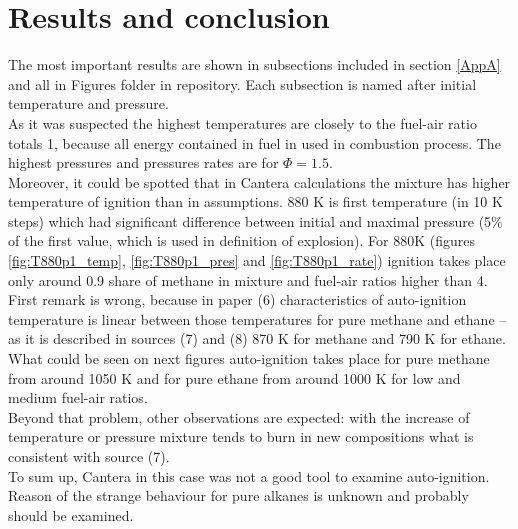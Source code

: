 		
		\section{Results and conclusion}
		The most important results are shown in subsections included in section \ref{AppA} and all in Figures folder in repository. Each subsection is named after initial temperature and pressure.
		\\As it was suspected the highest temperatures are closely to the fuel-air ratio totals 1, because all energy contained in fuel in used in combustion process. The highest pressures and pressures rates are for $\Phi=1.5$. 
		\\Moreover, it could be spotted that in Cantera calculations the mixture has higher temperature of ignition than in assumptions. 880 K is first temperature (in 10 K steps) which had significant difference between initial and maximal pressure (5\% of the first value, which is used in definition of explosion). For 880K (figures \ref{fig:T880p1_temp}, \ref{fig:T880p1_pres} and \ref{fig:T880p1_rate}) ignition takes place only around 0.9 share of methane in mixture and fuel-air ratios higher than 4. First remark is wrong, because in paper (6) characteristics of auto-ignition temperature is linear between those temperatures for pure methane and ethane – as it is described in sources (7) and (8) 870 K for methane and 790 K for ethane. What could be seen on next figures auto-ignition takes place for pure methane from around 1050 K and for pure ethane from around 1000 K for low and medium fuel-air ratios.
		\\Beyond that problem, other observations are expected: with the increase of temperature or pressure mixture tends to burn in new compositions what is consistent with source (7). 
		\\To sum up, Cantera in this case was not a good tool to examine auto-ignition. Reason of the strange behaviour for pure alkanes is unknown and probably should be examined.
		
